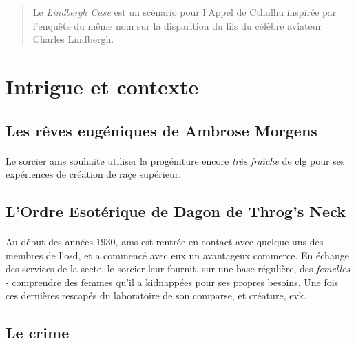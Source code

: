 \documentclass[a4paper,10pt]{article}
\title{}
\author{}
\begin{document}
\maketitle

\begin{abstract}
Le \emph{Lindbergh Case} est un scénario pour l'Appel de Cthulhu inspirée par l'enquête du même nom 
sur la disparition du fils du célèbre aviateur Charles Lindbergh.


\end{abstract}

\section{Intrigue et contexte}

\subsection{Les rêves eugéniques de Ambrose Morgens}

\paragraph{} Le sorcier \gls{ams} souhaite utiliser la progéniture encore \emph{très fraîche} de 
\gls{clg} pour ses expériences de création de raçe supérieur.

\subsection{L'Ordre Esotérique de Dagon de Throg's Neck}

\paragraph{} Au début des années 1930, \gls{ams} est rentrée en contact avec quelque uns des membres
de l'\gls{osd}, et a commencé avec eux un avantageux commerce. En échange des services de la secte, 
le sorcier leur fournit, sur une base régulière, des \emph{femelles} - comprendre des femmes qu'il a 
kidnappées pour ses propres besoins. Une fois ces dernières rescapés du laboratoire de son comparse, et 
créature, \gls{evk}.

\subsection{Le crime}
\end{document}
